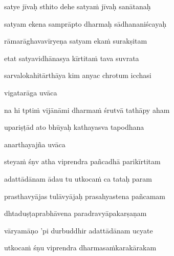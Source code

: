 satye jīvaḥ sthito dehe satya\.m jīvaḥ sanātanaḥ \veg\dontdisplaylinenum

satyam ekena samprāpto dharmaḥ sādhananiścayaḥ\thinspace{\dandab} \dontdisplaylinenum

rāmarāghavavīryeṇa satyam eka\.m surakṣitam \veg\dontdisplaylinenum

etat satyavidhānasya kīrtita\.m tava suvrata\thinspace{\dandab} \dontdisplaylinenum

sarvalokahitārthāya kim anyac chrotum icchasi \veg\dontdisplaylinenum

vigatarāga uvāca~{\dandab}\dontdisplaylinenum 

na hi tpti\.m vijānāmi dharma\.m śrutvā tathāpy aham\thinspace{\danda} \dontdisplaylinenum

upariṣṭād ato bhūyaḥ kathayasva tapodhana \veg\dontdisplaylinenum


anarthayajña uvāca~{\dandab}\dontdisplaylinenum 

steya\.m śṇv atha viprendra pañcadhā parikīrtitam\thinspace{\danda} \dontdisplaylinenum

adattādānam ādau tu utkoca\.m ca tataḥ param \veg\dontdisplaylinenum

prasthavyājas tulāvyājaḥ prasahyastena pañcamam\thinspace{\dandab} \dontdisplaylinenum

dhtaduṣṭaprabhāvena paradravyāpakarṣaṇam \veg\dontdisplaylinenum

vāryamāṇo 'pi durbuddhir adattādānam ucyate\thinspace{\dandab} \dontdisplaylinenum

utkoca\.m śṇu viprendra dharmasa\.mkarakārakam \veg\dontdisplaylinenum

